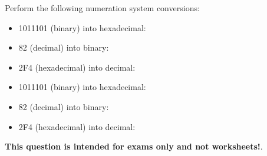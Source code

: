 

Perform the following numeration system conversions:

\begin{itemize}
\item{} 1011101 (binary) into hexadecimal: \underbar{\hskip 50pt}
\vskip 10pt
\item{} 82 (decimal) into binary: \underbar{\hskip 50pt}
\vskip 10pt
\item{} 2F4 (hexadecimal) into decimal: \underbar{\hskip 50pt}
\end{itemize}







\begin{itemize}
\item{} 1011101 (binary) into hexadecimal: 
\vskip 10pt
\item{} 82 (decimal) into binary: 
\vskip 10pt
\item{} 2F4 (hexadecimal) into decimal: 
\end{itemize}







{\bf This question is intended for exams only and not worksheets!}.


